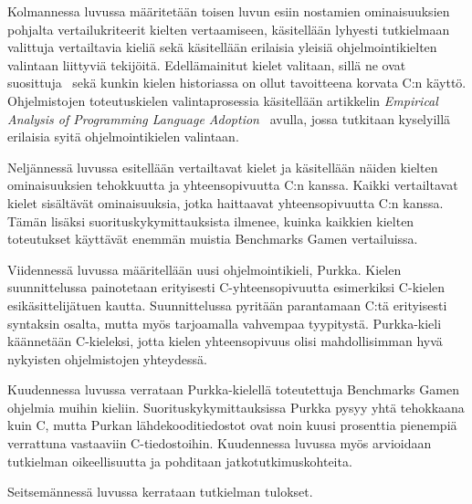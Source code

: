 Kolmannessa luvussa määritetään toisen luvun esiin nostamien ominaisuuksien
pohjalta vertailukriteerit kielten vertaamiseen, käsitellään lyhyesti
tutkielmaan valittuja vertailtavia kieliä sekä käsitellään erilaisia yleisiä
ohjelmointikielten valintaan liittyviä tekijöitä. Edellämainitut kielet
valitaan, sillä ne ovat suosittuja~\citep{tiobe} sekä kunkin kielen historiassa
on ollut tavoitteena korvata C:n käyttö. Ohjelmistojen toteutuskielen
valintaprosessia käsitellään artikkelin \emph{Empirical Analysis of Programming
Language Adoption}~\citep{empiricalpopularity} avulla, jossa tutkitaan
kyselyillä erilaisia syitä ohjelmointikielen valintaan.

Neljännessä luvussa esitellään vertailtavat kielet ja käsitellään näiden
kielten ominaisuuksien tehokkuutta ja yhteensopivuutta C:n kanssa. Kaikki
vertailtavat kielet sisältävät ominaisuuksia, jotka haittaavat yhteensopivuutta
C:n kanssa. Tämän lisäksi suorituskykymittauksista ilmenee, kuinka kaikkien
kielten toteutukset käyttävät enemmän muistia Benchmarks Gamen vertailuissa.

Viidennessä luvussa määritellään uusi ohjelmointikieli, Purkka. Kielen
suunnittelussa painotetaan erityisesti C-yhteensopivuutta esimerkiksi C-kielen
esikäsittelijätuen kautta. Suunnittelussa pyritään parantamaan C:tä erityisesti
syntaksin osalta, mutta myös tarjoamalla vahvempaa tyypitystä. Purkka-kieli
käännetään C-kieleksi, jotta kielen yhteensopivuus olisi mahdollisimman hyvä
nykyisten ohjelmistojen yhteydessä.

Kuudennessa luvussa verrataan Purkka-kielellä toteutettuja Benchmarks Gamen
ohjelmia muihin kieliin. Suorituskykymittauksissa Purkka pysyy yhtä tehokkaana
kuin C, mutta Purkan lähdekooditiedostot ovat noin kuusi prosenttia pienempiä
verrattuna vastaaviin C-tiedostoihin. Kuudennessa luvussa myös arvioidaan
tutkielman oikeellisuutta ja pohditaan jatkotutkimuskohteita.

Seitsemännessä luvussa kerrataan tutkielman tulokset.
